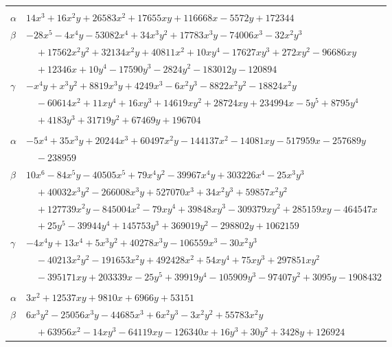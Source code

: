 \documentclass[11pt]{article}
\begin{document}
\begin{longtable}{@{}ll@{}}
\addlinespace[3pt]
\multicolumn{2}{@{}l}{$\{i,j\}=\{83,103\}$, $k_{ij}=2\cdot 3^{2}\cdot 5^{2}\cdot 7^{3}$}\\
$\alpha$ & $14x^{3}+16x^{2}y+26583x^{2}+17655xy+116668x-5572y+172344$\\
$\beta$ & $-28x^{5}-4x^{4}y-53082x^{4}+34x^{3}y^{2}+17783x^{3}y-74006x^{3}-32x^{2}y^{3}$\\
 & $\quad +17562x^{2}y^{2}+32134x^{2}y+40811x^{2}+10xy^{4}-17627xy^{3}+272xy^{2}-96686xy$\\
 & $\quad +12346x+10y^{4}-17590y^{3}-2824y^{2}-183012y-120894$\\
$\gamma$ & $-x^{4}y+x^{3}y^{2}+8819x^{3}y+4249x^{3}-6x^{2}y^{3}-8822x^{2}y^{2}-18824x^{2}y$\\
 & $\quad -60614x^{2}+11xy^{4}+16xy^{3}+14619xy^{2}+28724xy+234994x-5y^{5}+8795y^{4}$\\
 & $\quad +4183y^{3}+31719y^{2}+67469y+196704$\\
\addlinespace[3pt]
\multicolumn{2}{@{}l}{$\{i,j\}=\{83,138\}$, $k_{ij}=2^{5}\cdot 3^{2}\cdot 5^{2}\cdot 7^{3}$}\\
$\alpha$ & $-5x^{4}+35x^{3}y+20244x^{3}+60497x^{2}y-144137x^{2}-14081xy-517959x-257689y$\\
 & $\quad -238959$\\
$\beta$ & $10x^{6}-84x^{5}y-40505x^{5}+79x^{4}y^{2}-39967x^{4}y+303226x^{4}-25x^{3}y^{3}$\\
 & $\quad +40032x^{3}y^{2}-266008x^{3}y+527070x^{3}+34x^{2}y^{3}+59857x^{2}y^{2}$\\
 & $\quad +127739x^{2}y-845004x^{2}-79xy^{4}+39848xy^{3}-309379xy^{2}+285159xy-464547x$\\
 & $\quad +25y^{5}-39944y^{4}+145753y^{3}+369019y^{2}-298802y+1062159$\\
$\gamma$ & $-4x^{4}y+13x^{4}+5x^{3}y^{2}+40278x^{3}y-106559x^{3}-30x^{2}y^{3}$\\
 & $\quad -40213x^{2}y^{2}-191653x^{2}y+492428x^{2}+54xy^{4}+75xy^{3}+297851xy^{2}$\\
 & $\quad -395171xy+203339x-25y^{5}+39919y^{4}-105909y^{3}-97407y^{2}+3095y-1908432$\\
\addlinespace[3pt]
\multicolumn{2}{@{}l}{$\{i,j\}=\{83,139\}$, $k_{ij}=3^{2}\cdot 5^{2}\cdot 7^{4}$}\\
$\alpha$ & $3x^{2}+12537xy+9810x+6966y+53151$\\
$\beta$ & $6x^{3}y^{2}-25056x^{3}y-44685x^{3}+6x^{2}y^{3}-3x^{2}y^{2}+55783x^{2}y$\\
 & $\quad +63956x^{2}-14xy^{3}-64119xy-126340x+16y^{3}+30y^{2}+3428y+126924$\\

\end{longtable}
\end{document}
